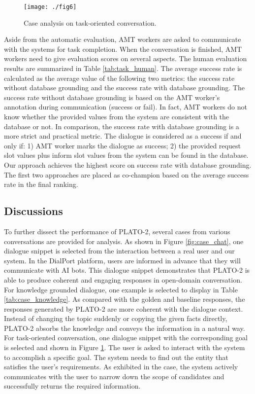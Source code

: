 \documentclass[letterpaper]{article} \usepackage{aaai21}  \usepackage{times}  \usepackage{helvet} \usepackage{courier}  \usepackage[hyphens]{url}  \usepackage{graphicx} \urlstyle{rm} \def\UrlFont{\rm}  \usepackage{natbib}  \usepackage{caption} \frenchspacing  \setlength{\pdfpagewidth}{8.5in}  \setlength{\pdfpageheight}{11in}  \usepackage{amsmath}
\begin{document}
\begin{figure}
	\centering
	\texttt{[image: ./fig6]}
	\caption{Case analysis on task-oriented conversation.}
	\label{fig:case_task}
\end{figure} 
Aside from the automatic evaluation, AMT workers are asked to communicate with the systems for task completion. When the conversation is finished, AMT workers need to give evaluation scores on several aspects. The human evaluation results are summarized in Table \ref{tab:task_human}. The average success rate is calculated as the average value of the following two metrics: the success rate without database grounding and the success rate with database grounding. The success rate without database grounding is based on the AMT worker's annotation during communication (success or fail). In fact, AMT workers do not know whether the provided values from the system are consistent with the database or not. In comparison, the success rate with database grounding is a more strict and practical metric. The dialogue is considered as a success if and only if: 1) AMT worker marks the dialogue as success; 2) the provided request slot values plus inform slot values from the system can be found in the database. Our approach achieves the highest score on success rate with database grounding. The first two approaches are placed as co-champion based on the average success rate in the final ranking. 

\subsection{Discussions}
To further dissect the performance of PLATO-2, several cases from various conversations are provided for analysis. As shown in Figure \ref{fig:case_chat}, one dialogue snippet is selected from the interaction between a real user and our system. In the DialPort platform, users are informed in advance that they will communicate with AI bots. This dialogue snippet demonstrates that PLATO-2 is able to produce coherent and engaging responses in open-domain conversation. For knowledge grounded dialogue, one example is selected to display in Table \ref{tab:case_knowledge}. As compared with the golden and baseline responses, the responses generated by PLATO-2 are more coherent with the dialogue context. Instead of changing the topic suddenly or copying the given facts directly, PLATO-2 absorbs the knowledge and conveys the information in a natural way. For task-oriented conversation, one dialogue snippet with the corresponding goal is selected and shown in Figure \ref{fig:case_task}. The user is asked to interact with the system to accomplish a specific goal. The system needs to find out the entity that satisfies the user's requirements. As exhibited in the case, the system actively communicates with the user to narrow down the scope of candidates and successfully returns the required information. 
\end{document}
